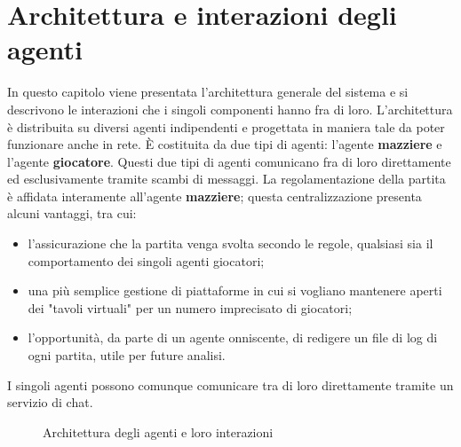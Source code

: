 \chapter*{Architettura e interazioni degli agenti}
\graphicspath{{Chapter3/Chapter3Figs/PNG/}{Chapter3/Chapter3Figs/PDF/}{Chapter3/Chapter3Figs/}}

In questo capitolo viene presentata l'architettura generale del sistema e si descrivono le interazioni che i singoli componenti hanno fra di loro.
L'architettura è distribuita su diversi agenti indipendenti e progettata in maniera tale da poter funzionare anche in rete.
È costituita da due tipi di agenti: l'agente \textbf{mazziere} e l'agente \textbf{giocatore}.
Questi due tipi di agenti comunicano fra di loro direttamente ed esclusivamente tramite scambi di messaggi.
La regolamentazione della partita è affidata interamente all'agente \textbf{mazziere}; questa centralizzazione presenta alcuni vantaggi, tra cui:
\begin{itemize}
   \item l'assicurazione che la partita venga svolta secondo le regole, qualsiasi sia il comportamento dei singoli agenti giocatori;
   \item una più semplice gestione di piattaforme in cui si vogliano mantenere aperti dei "tavoli virtuali" per un numero imprecisato di giocatori;
   \item l'opportunità, da parte di un agente onniscente, di redigere un file di log di ogni partita, utile per future analisi.
\end{itemize}

I singoli agenti possono comunque comunicare tra di loro direttamente tramite un servizio di chat.

\begin{figure}[!htbp]
  \begin{center}
    \leavevmode
    \caption{Architettura degli agenti e loro interazioni}
    \label{architettura}
  \end{center}
\end{figure}
